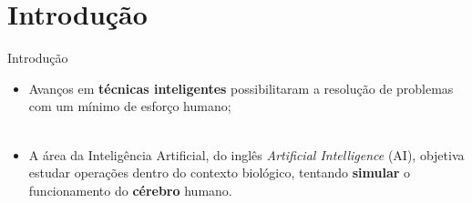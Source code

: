 \section{Introdução}
\label{s.introduction}

\begin{frame}{Introdução}
	\begin{itemize}
		\justifying
		\item Avanços em \textbf{técnicas inteligentes} possibilitaram a resolução de problemas com um mínimo de esforço humano;
		\\~\\
		\item A área da Inteligência Artificial, do inglês \emph{Artificial Intelligence} (AI), objetiva estudar operações dentro do contexto biológico, tentando \textbf{simular} o funcionamento do \textbf{cérebro} humano.
	\end{itemize}
\end{frame}
